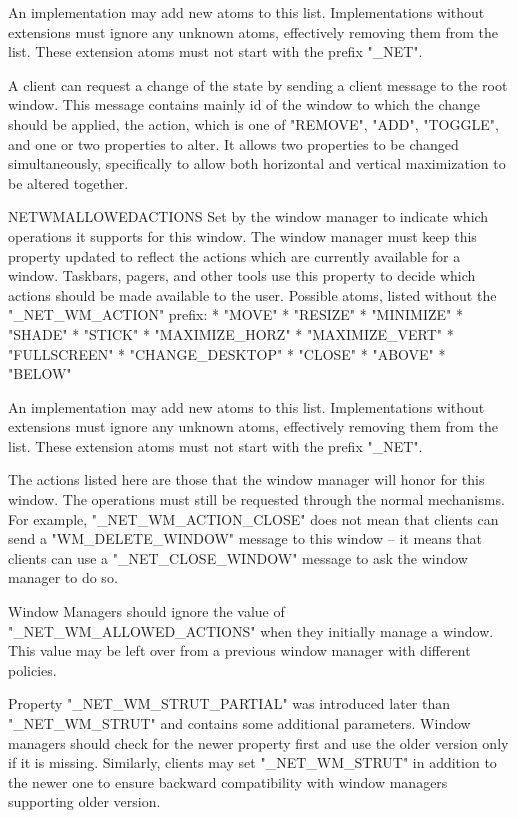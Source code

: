 An implementation may add new atoms to this list.
Implementations without extensions must ignore any unknown atoms, effectively removing them from the list.
These extension atoms must not start with the prefix "_NET".

A client can request a change of the state by sending a client message to the root window.
This message contains mainly id of the window to which the change should be applied,
the action, which is one of "REMOVE", "ADD", "TOGGLE", and one or two properties to alter.
It allows two properties to be changed simultaneously, specifically to allow both horizontal and
vertical maximization to be altered together.

\heading \uns NET\uns WM\uns ALLOWED\uns ACTIONS
Set by the window manager to indicate which operations it supports for this window.
The window manager must keep this property updated to reflect the actions which are currently available for a window.
Taskbars, pagers, and other tools use this property to decide which actions should be made available to the user.
Possible atoms, listed without the "_NET_WM_ACTION" prefix:
\begitems
* "MOVE"
* "RESIZE"
* "MINIMIZE"
* "SHADE"
* "STICK"
* "MAXIMIZE_HORZ"
* "MAXIMIZE_VERT"
* "FULLSCREEN"
* "CHANGE_DESKTOP"
* "CLOSE"
* "ABOVE"
* "BELOW"
\enditems

An implementation may add new atoms to this list.
Implementations without extensions must ignore any unknown atoms, effectively removing them from the list.
These extension atoms must not start with the prefix "_NET".

The actions listed here are those that the window manager will honor for this window.
The operations must still be requested through the normal mechanisms.
For example, "_NET_WM_ACTION_CLOSE" does not mean that clients can send a "WM_DELETE_WINDOW" message to this window -- it means that clients can
use a "_NET_CLOSE_WINDOW" message to ask the window manager to do so.

Window Managers should ignore the value of "_NET_WM_ALLOWED_ACTIONS" when they initially manage a window.
This value may be left over from a previous window manager with different policies.

Property "_NET_WM_STRUT_PARTIAL" was introduced later than "_NET_WM_STRUT" and contains some additional parameters.
Window managers should check for the newer property first and use the older version only if it is missing.
Similarly, clients may set "_NET_WM_STRUT" in addition to the newer one to ensure backward compatibility with
window managers supporting older version.

